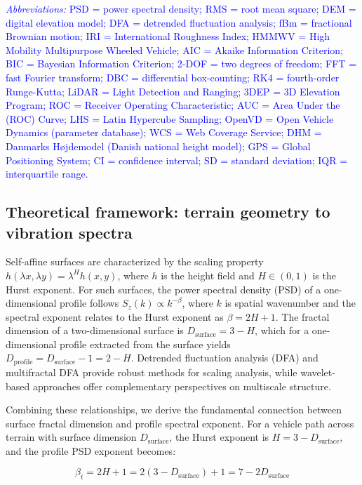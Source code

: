 \documentclass[11pt]{article}
\begin{document}
\textcolor{blue}{\textit{Abbreviations:} PSD = power spectral density; RMS = root mean square; DEM = digital elevation model; DFA = detrended fluctuation analysis; fBm = fractional Brownian motion; IRI = International Roughness Index; HMMWV = High Mobility Multipurpose Wheeled Vehicle; AIC = Akaike Information Criterion; BIC = Bayesian Information Criterion; 2-DOF = two degrees of freedom; FFT = fast Fourier transform; DBC = differential box-counting; RK4 = fourth-order Runge-Kutta; LiDAR = Light Detection and Ranging; 3DEP = 3D Elevation Program; ROC = Receiver Operating Characteristic; AUC = Area Under the (ROC) Curve; LHS = Latin Hypercube Sampling; OpenVD = Open Vehicle Dynamics (parameter database); WCS = Web Coverage Service; DHM = Danmarks H\o jdemodel (Danish national height model); GPS = Global Positioning System; CI = confidence interval; SD = standard deviation; IQR = interquartile range.}

\subsection*{Theoretical framework: terrain geometry to vibration spectra}

Self-affine surfaces are characterized by the scaling property $h(\lambda x, \lambda y) = \lambda^H h(x,y)$, where $h$ is the height field and $H \in (0,1)$ is the Hurst exponent\cite{MandelbrotVanNess1968}. For such surfaces, the power spectral density (PSD) of a one-dimensional profile follows $S_z(k) \propto k^{-\beta}$, where $k$ is spatial wavenumber and the spectral exponent relates to the Hurst exponent as $\beta = 2H + 1$\cite{MandelbrotVanNess1968}. The fractal dimension of a two-dimensional surface is $D_{\text{surface}} = 3 - H$\cite{Mandelbrot1982,Turcotte1997}, which for a one-dimensional profile extracted from the surface yields $D_{\text{profile}} = D_{\text{surface}} - 1 = 2 - H$. Detrended fluctuation analysis (DFA)\cite{Peng1994} and multifractal DFA\cite{Kantelhardt2002} provide robust methods for scaling analysis, while wavelet-based approaches\cite{Muzy1993,Mallat2009} offer complementary perspectives on multiscale structure.

Combining these relationships, we derive the fundamental connection between surface fractal dimension and profile spectral exponent. For a vehicle path across terrain with surface dimension $D_{\text{surface}}$, the Hurst exponent is $H = 3 - D_{\text{surface}}$, and the profile PSD exponent becomes:

\begin{equation}
\beta_t = 2H + 1 = 2(3 - D_{\text{surface}}) + 1 = 7 - 2D_{\text{surface}}
\end{equation}
\end{document}
